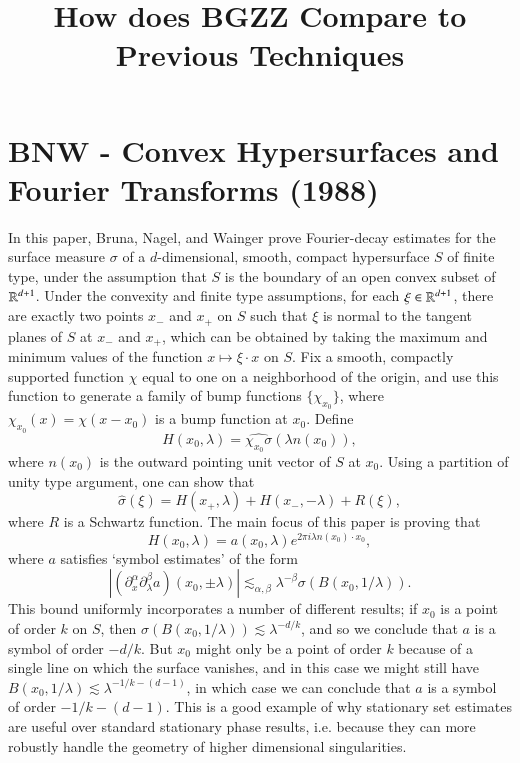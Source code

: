 

\title{How does BGZZ Compare to Previous Techniques}



\maketitle

\chapter{BNW - Convex Hypersurfaces and Fourier Transforms (1988)}

In this paper, Bruna, Nagel, and Wainger prove Fourier-decay estimates for the surface measure $\sigma$ of a $d$-dimensional, smooth, compact hypersurface $S$ of finite type, under the assumption that $S$ is the boundary of an open convex subset of $\operatorname{\mathbb{R}}^{d+1}$. Under the convexity and finite type assumptions, for each $\xi \in \operatorname{\mathbb{R}}^{d+1}$, there are exactly two points $x_-$ and $x_+$ on $S$ such that $\xi$ is normal to the tangent planes of $S$ at $x_-$ and $x_+$, which can be obtained by taking the maximum and minimum values of the function $x \mapsto \xi \cdot x$ on $S$. Fix a smooth, compactly supported function $\chi$ equal to one on a neighborhood of the origin, and use this function to generate a family of bump functions $\{ \chi_{x_0} \}$, where $\chi_{x_0}(x) = \chi(x - x_0)$ is a bump function at $x_0$. Define
%
\[ H(x_0, \lambda) = \widehat{\chi_{x_0} \sigma}(\lambda n(x_0)), \]
%
where $n(x_0)$ is the outward pointing unit vector of $S$ at $x_0$. Using a partition of unity type argument, one can show that
%
\[ \widehat{\sigma}(\xi) = H(x_+, \lambda) + H(x_-, - \lambda) + R(\xi), \]
%
where $R$ is a Schwartz function. The main focus of this paper is proving that
%
\[ H(x_0, \lambda) = a(x_0,\lambda) e^{2 \pi i \lambda n(x_0) \cdot x_0}, \]
%
where $a$ satisfies `symbol estimates' of the form
%
\[ \left| (\partial^\alpha_x \partial^\beta_\lambda a)(x_0, \pm \lambda)\right| \lesssim_{\alpha,\beta} \lambda^{-\beta} \sigma\left( B \left(x_0, 1/\lambda \right) \right). \]
%
This bound uniformly incorporates a number of different results; if $x_0$ is a point of order $k$ on $S$, then $\sigma(B(x_0,1/\lambda)) \lesssim \lambda^{-d/k}$, and so we conclude that $a$ is a symbol of order $-d/k$. But $x_0$ might only be a point of order $k$ because of a single line on which the surface vanishes, and in this case we might still have $B(x_0,1/\lambda) \lesssim \lambda^{-1/k - (d-1)}$, in which case we can conclude that $a$ is a symbol of order $-1/k - (d-1)$. This is a good example of why stationary set estimates are useful over standard stationary phase results, i.e. because they can more robustly handle the geometry of higher dimensional singularities.

